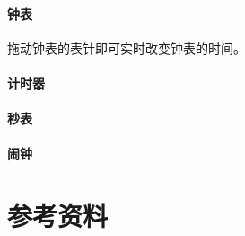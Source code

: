 \documentclass[UTF8]{ctexart}
\begin{document}
	\paragraph{钟表}
		拖动钟表的表针即可实时改变钟表的时间。
	\paragraph{计时器}
	
	\paragraph{秒表}
	
	\paragraph{闹钟}
	

	
	\section{参考资料} %
\end{document}
